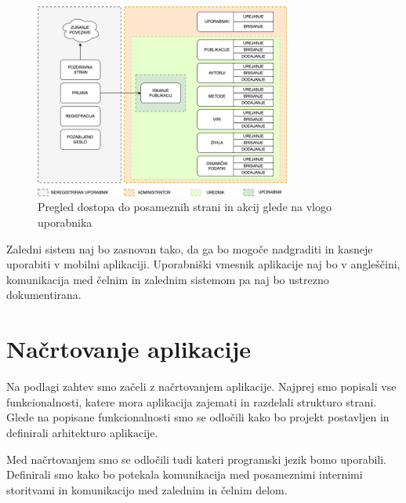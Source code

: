 \documentclass[a4paper, 12pt]{book}
\begin{document}
\begin{figure}[h]
\begin{center}
\includegraphics[width=0.75\textwidth]{slike/user_hierarchy.png}
\end{center}
\caption{ Pregled dostopa do posameznih strani in akcij glede na vlogo uporabnika }
\label{user-rights}
\end{figure}

Zaledni sistem naj bo zasnovan tako, da ga bo mogoče nadgraditi in kasneje uporabiti v mobilni aplikaciji. Uporabniški vmesnik aplikacije naj bo v angleščini, komunikacija med čelnim in zalednim sistemom pa naj bo ustrezno dokumentirana.



\section{Načrtovanje aplikacije}
\label{nacrtovanje}
Na podlagi zahtev smo začeli z načrtovanjem aplikacije. Najprej smo popisali vse funkcionalnosti, katere mora aplikacija zajemati in razdelali strukturo strani. Glede na popisane funkcionalnosti smo se odločili kako bo projekt postavljen in definirali arhitekturo aplikacije. 

Med načrtovanjem smo se odločili tudi kateri programski jezik bomo uporabili. Definirali smo kako bo potekala komunikacija med posameznimi internimi storitvami in komunikacijo med zalednim in čelnim delom. 
\end{document}
